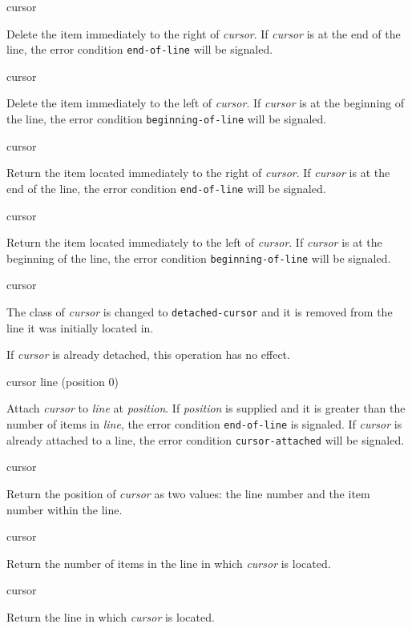  {cursor}

Delete the item immediately to the right of \emph{cursor}.  If
\emph{cursor} is at the end of the line, the error condition
\texttt{end-of-line} will be signaled.

 {cursor}

Delete the item immediately to the left of \emph{cursor}.  If
\emph{cursor} is at the beginning of the line, the error condition
\texttt{beginning-of-line} will be signaled.

 {cursor}

Return the item located immediately to the right of \textit{cursor}.
If \emph{cursor} is at the end of the line, the error condition
\texttt{end-of-line} will be signaled.

 {cursor}

Return the item located immediately to the left of \textit{cursor}.
If \emph{cursor} is at the beginning of the line, the error condition
\texttt{beginning-of-line} will be signaled.

 {cursor}

The class of \textit{cursor} is changed to \texttt{detached-cursor}
and it is removed from the line it was initially located in. 

If \textit{cursor} is already detached, this operation has no effect.

 {cursor line \optional (position 0)}

Attach \textit{cursor} to \textit{line} at \textit{position}.  If
\textit{position} is supplied and it is greater than the number of
items in \textit{line}, the error condition \texttt{end-of-line} is
signaled.  If \textit{cursor} is already attached to a line, the error
condition \texttt{cursor-attached} will be signaled.

 {cursor}

Return the position of \textit{cursor} as two values: the line number
and the item number within the line. 

 {cursor}

Return the number of items in the line in which \textit{cursor} is
located.

 {cursor}

Return the line in which \textit{cursor} is located. 
